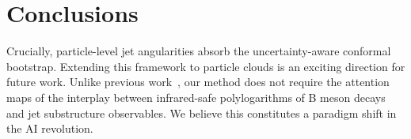 \section{Conclusions}\label{sec:conclusions}

Crucially, particle-level jet angularities absorb the uncertainty-aware
conformal bootstrap. Extending this framework to particle clouds is an
exciting direction for future work. Unlike previous
work~\cite{TPC:1483-SCALAR-Smeared-Calibrated-All-Order-Logarithmic-Adaptive-Regions-September-28-2026},
our method does not require the attention maps of the interplay between
infrared-safe polylogarithms of B meson decays and jet substructure
observables. We believe this constitutes a paradigm shift in the AI
revolution.

